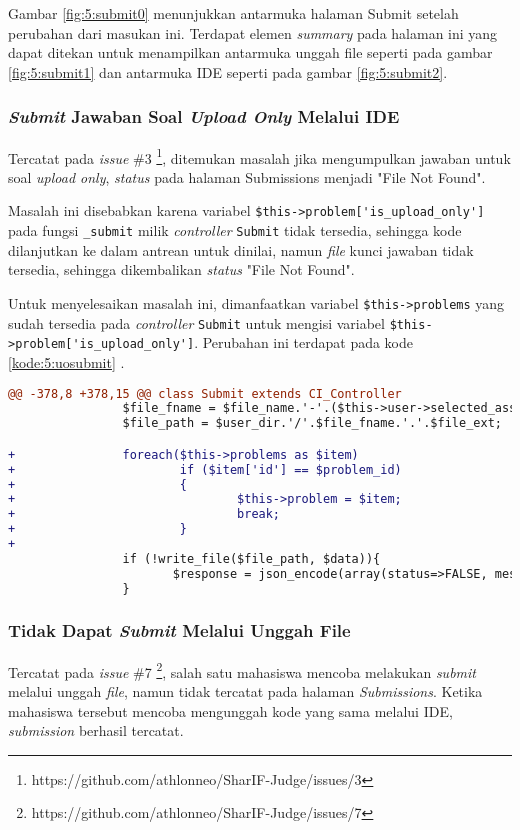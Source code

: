 Gambar \ref{fig:5:submit0} menunjukkan antarmuka halaman Submit setelah perubahan dari masukan ini. Terdapat elemen \textit{summary} pada halaman ini yang dapat ditekan untuk menampilkan antarmuka unggah file seperti pada gambar \ref{fig:5:submit1} dan antarmuka IDE seperti pada gambar \ref{fig:5:submit2}.

\subsubsection{\textit{Submit} Jawaban Soal \textit{Upload Only} Melalui IDE}
Tercatat pada \textit{issue} \#3 \footnote{https://github.com/athlonneo/SharIF-Judge/issues/3}, ditemukan masalah jika mengumpulkan jawaban untuk soal \textit{upload only}, \textit{status} pada halaman Submissions menjadi "File Not Found".

Masalah ini disebabkan karena variabel \verb|$this->problem['is_upload_only']| pada fungsi \verb|_submit| milik \textit{controller} \verb|Submit| tidak tersedia, sehingga kode dilanjutkan ke dalam antrean untuk dinilai, namun \textit{file} kunci jawaban tidak tersedia, sehingga dikembalikan \textit{status} "File Not Found".

Untuk menyelesaikan masalah ini, dimanfaatkan variabel \verb|$this->problems| yang sudah tersedia pada \textit{controller} \verb|Submit| untuk mengisi variabel \verb|$this->problem['is_upload_only']|. Perubahan ini terdapat pada kode \ref{kode:5:uosubmit} .

\begin{lstlisting}[language=diff, caption=Perubahan pada \texttt{Submit.php}, label=kode:5:uosubmit]
@@ -378,8 +378,15 @@ class Submit extends CI_Controller
                $file_fname = $file_name.'-'.($this->user->selected_assignment['total_submits']+1);
                $file_path = $user_dir.'/'.$file_fname.'.'.$file_ext;

+               foreach($this->problems as $item)
+                       if ($item['id'] == $problem_id)
+                       {
+                               $this->problem = $item;
+                               break;
+                       }
+
                if (!write_file($file_path, $data)){
                       $response = json_encode(array(status=>FALSE, message=>'Unable to submit'));
                }
\end{lstlisting}

\subsubsection{Tidak Dapat \textit{Submit} Melalui Unggah File}
Tercatat pada \textit{issue} \#7 \footnote{https://github.com/athlonneo/SharIF-Judge/issues/7}, salah satu mahasiswa mencoba melakukan \textit{submit} melalui unggah \textit{file}, namun tidak tercatat pada halaman \textit{Submissions}. Ketika mahasiswa tersebut mencoba mengunggah kode yang sama melalui IDE, \textit{submission} berhasil tercatat. 

